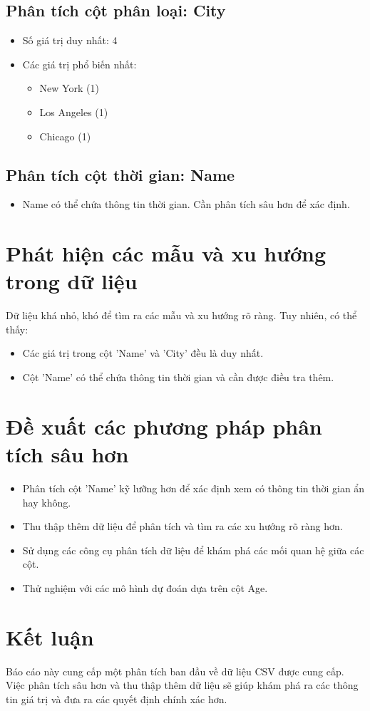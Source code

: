 \documentclass[12pt]{article}
\begin{document}
\subsection{Phân tích cột phân loại: City}
\begin{itemize}
    \item Số giá trị duy nhất: 4
    \item Các giá trị phổ biến nhất:
    \begin{itemize}
        \item New York (1)
        \item Los Angeles (1)
        \item Chicago (1)
    \end{itemize}
\end{itemize}

\subsection{Phân tích cột thời gian: Name}
\begin{itemize}
    \item Name có thể chứa thông tin thời gian. Cần phân tích sâu hơn để xác định.
\end{itemize}

\section{Phát hiện các mẫu và xu hướng trong dữ liệu}

Dữ liệu khá nhỏ, khó để tìm ra các mẫu và xu hướng rõ ràng. Tuy nhiên, có thể thấy:

\begin{itemize}
    \item Các giá trị trong cột 'Name' và 'City' đều là duy nhất.
    \item Cột 'Name' có thể chứa thông tin thời gian và cần được điều tra thêm.
\end{itemize}

\section{Đề xuất các phương pháp phân tích sâu hơn}

\begin{itemize}
    \item Phân tích cột 'Name' kỹ lưỡng hơn để xác định xem có thông tin thời gian ẩn hay không.
    \item Thu thập thêm dữ liệu để phân tích và tìm ra các xu hướng rõ ràng hơn.
    \item Sử dụng các công cụ phân tích dữ liệu để khám phá các mối quan hệ giữa các cột.
    \item Thử nghiệm với các mô hình dự đoán dựa trên cột Age.
\end{itemize}

\section{Kết luận}

Báo cáo này cung cấp một phân tích ban đầu về dữ liệu CSV được cung cấp. Việc phân tích sâu hơn và thu thập thêm dữ liệu sẽ giúp khám phá ra các thông tin giá trị và đưa ra các quyết định chính xác hơn.
\end{document}
